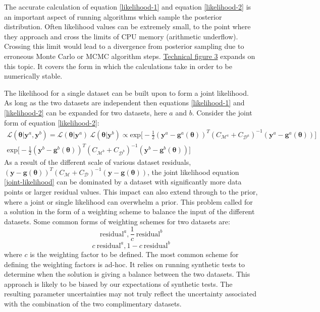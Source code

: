The accurate calculation of equation \ref{likelihood-1} and equation \ref{likelihood-2} is an important aspect of running algorithms which sample the posterior distribution. Often likelihood values can be extremely small, to the point where they approach and cross the limits of CPU memory (arithmetic underflow). Crossing this limit would lead to a divergence from posterior sampling due to erroneous Monte Carlo or MCMC algorithm steps. \hyperref[tf3]{Technical figure 3} expands on this topic. It covers the form in which the calculations take in order to be numerically stable.\par

The likelihood for a single dataset can be built upon to form a joint likelihood. As long as the two datasets are independent then equations \ref{likelihood-1} and \ref{likelihood-2} can be expanded for two datasets, here $a$ and $b$. Consider the joint form of equation \ref{likelihood-2}:
\begin{multline}
\mathcal{L}(\bm{\theta}|\bm{y}^a,\bm{y}^b) = \mathcal{L}(\bm{\theta}|\bm{y}^a)\ \mathcal{L}(\bm{\theta}|\bm{y}^b)
\propto \text{exp}\bigg[-\frac{1}{2}(\bm{y}^a-\bm{g}^a(\bm{\theta}))^T(C_{\mathcal{M}^a}+C_{\mathcal{D}^a})^{-1}(\bm{y}^a-\bm{g}^a(\bm{\theta}))\bigg]\ \\
\text{exp}\bigg[-\frac{1}{2}(\bm{y}^b-\bm{g}^b(\bm{\theta}))^T(C_{\mathcal{M}^b}+C_{\mathcal{D}^b})^{-1}(\bm{y}^b-\bm{g}^b(\bm{\theta}))\bigg]
\label{joint-likelihood}
\end{multline}
As a result of the different scale of various dataset residuals, $(\bm{y}-\bm{g}(\bm{\theta}))^T(C_{\mathcal{M}}+C_{\mathcal{D}})^{-1}(\bm{y}-\bm{g}(\bm{\theta}))$, the joint likelihood equation \ref{joint-likelihood} can be  dominated by a dataset with significantly more data points or larger residual values. This impact can also extend through to the prior, where a joint or single likelihood can overwhelm a prior. This problem called for a solution in the form of a weighting scheme to balance the input of the different datasets. Some common forms of weighting schemes for two datasets are:
\begin{equation}
\text{residual}^a, \frac{1}{c}\ \text{residual}^b
\end{equation}
\begin{equation}
c\ \text{residual}^a, 1-c\ \text{residual}^b
\end{equation}
where $c$ is the weighting factor to be defined. The most common scheme for defining the weighting factors is ad-hoc. It relies on running synthetic tests to determine when the solution is giving a balance between the two datasets. This approach is likely to be biased by our expectations of synthetic tests. The resulting parameter uncertainties may not truly reflect the uncertainty associated with the combination of the two complimentary datasets. \par

